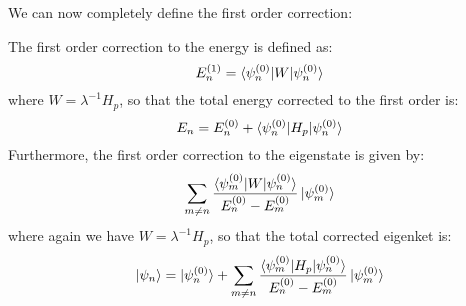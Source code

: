 We can now completely define the first order correction:
\begin{definition}
    The first order correction to the energy is defined as:
    \begin{equation}
        E_n^{(1)} = \braket{\psi_n^{(0)}|W|\psi_n^{(0)}}
    \end{equation}
    where $W = \lambda^{-1}H_p$, so that the total energy corrected to the first order is:
    \begin{equation}
        E_n = E_n^{(0)} + \braket{\psi_n^{(0)}|H_p|\psi_n^{(0)}}
    \end{equation}
    Furthermore, the first order correction to the eigenstate is given by:
    \begin{equation}
        \sum_{m\neq n} \frac{\braket{\psi_m^{(0)}|W|\psi_n^{(0)}}}{E_n^{(0)} - E_m^{(0)}}\ket{\psi_m^{(0)}}
    \end{equation}
    where again we have $W = \lambda^{-1}H_p$, so that the total corrected eigenket is:
    \begin{equation}
        \ket{\psi_n} = \ket{\psi_n^{(0)}} + \sum_{m\neq n} \frac{\braket{\psi_m^{(0)}|H_p|\psi_n^{(0)}}}{E_n^{(0)} - E_m^{(0)}}\ket{\psi_m^{(0)}}
    \end{equation}
\end{definition}
